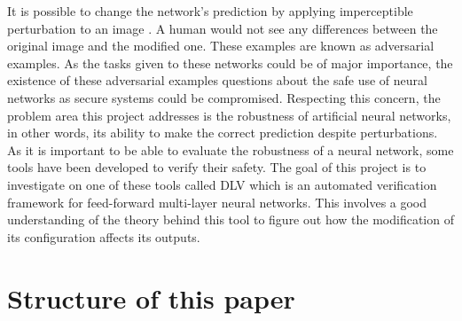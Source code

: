It is possible to change the network's prediction by applying imperceptible perturbation to an image \cite{Intriguing}.  A human would not see any differences between the original image and the modified one. These examples are known as adversarial examples. As the tasks given to these networks could be of major importance, the existence of these adversarial examples questions about the safe use of neural networks as secure systems could be compromised. 
Respecting this concern, the problem area this project addresses is the robustness of artificial neural networks, in other words,  its ability to make the correct prediction despite perturbations. As it is important to be able to evaluate the robustness of a neural network, some tools have been developed to verify their safety. The goal of this project is to investigate on one of these tools called DLV which is an automated verification framework for feed-forward multi-layer neural networks.
This involves a good understanding of the theory behind this tool to figure out how the modification of its configuration affects its outputs.


\section{Structure of this paper}
